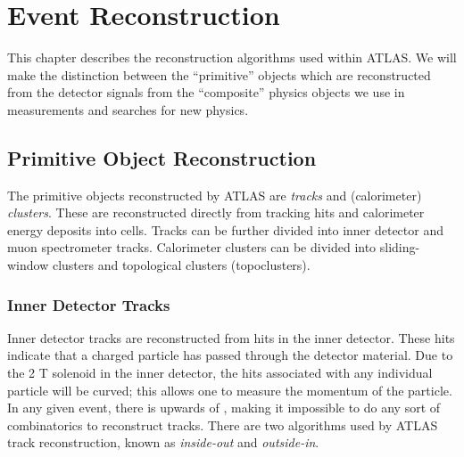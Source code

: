 

\chapter[Event Reconstruction][Top of Page Title]{Event Reconstruction}

This chapter describes the reconstruction algorithms used within ATLAS.
We will make the distinction between the ``primitive'' objects which are reconstructed from the detector signals from the ``composite'' physics objects we use in measurements and searches for new physics.

\section{Primitive Object Reconstruction}

The primitive objects reconstructed by ATLAS are \textit{tracks} and (calorimeter) \textit{clusters}.
These are reconstructed directly from tracking hits and calorimeter energy deposits into cells.
Tracks can be further divided into inner detector and muon spectrometer tracks.
Calorimeter clusters can be divided into sliding-window clusters and topological clusters (topoclusters).
\subsection{Inner Detector Tracks}\label{sec:id_tracks}

Inner detector tracks are reconstructed from hits in the inner detector.
These hits indicate that a charged particle has passed through the detector material.
Due to the 2 T solenoid in the inner detector, the hits associated with any individual particle will be curved; this allows one to measure the momentum of the particle.
In any given event, there is upwards of , making it impossible to do any sort of combinatorics to reconstruct tracks\footnotemark.
There are two algorithms used by ATLAS track reconstruction, known as \textit{inside-out} and \textit{outside-in}.

